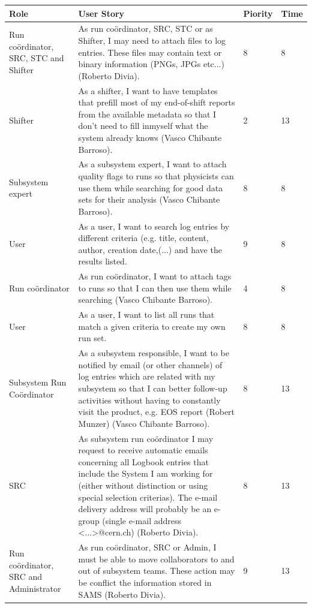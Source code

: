 \documentclass[paper=a4, fontsize=11pt,twoside]{scrartcl}	%
\begin{document}
\begin{longtable}{ | p{2cm} | p{8cm} | p{1.5cm} | l |}
\hline
Role & User Story & Piority & Time \\ \hline
Run coördinator, SRC, STC and Shifter& As run coördinator, SRC, STC or as Shifter, I may need to attach files to log entries. These files may contain text or binary information (PNGs, JPGs etc...) (Roberto Divia). & 8 & 8 \\ \hline
Shifter &  As a shifter, I want to have templates that prefill most of my end-of-shift reports from the available metadata so that I don’t need to fill inmyself what the system already knows (Vasco Chibante Barroso). & 2 & 13 \\ \hline
Subsystem expert & As a subsystem expert, I want to attach quality flags to runs so that
physicists can use them while searching for good data sets for their analysis (Vasco Chibante Barroso). & 8 & 8 \\ \hline
User & As a user, I want to search log entries by different criteria (e.g. title, content, author, creation date,(...) and have the results listed. & 9 & 8 \\ \hline
Run coördinator &  As run coördinator, I want to attach tags to runs so that I can then use them while searching (Vasco Chibante Barroso). & 4 & 8 \\ \hline
User &  As a user, I want to list all runs that match a given criteria to create my own run set. & 8 & 8 \\ \hline
Subsystem Run Coördinator &  As a subsystem responsible, I want to be notified by email (or other
channels) of log entries which are related with my subsystem so that I can better follow-up activities without having to constantly visit the product, e.g. EOS report (Robert Munzer) (Vasco Chibante Barroso). & 8 & 13 \\ \hline
SRC & As subsystem run coördinator I may request to receive automatic emails concerning all Logbook entries that include the System I am working for (either without distinction or using special selection criterias). The e-mail delivery address will probably be an e-group (single e-mail address <...>@cern.ch) (Roberto Divia). & 8 & 13 \\ \hline
Run coördinator, SRC and Administrator &  As run coördinator, SRC or Admin, I must be able to move collaborators to and out of subsystem teams. These action may be conflict the information stored in SAMS (Roberto Divia). & 9 & 13 \\ \hline
\end{longtable}
\end{document}
